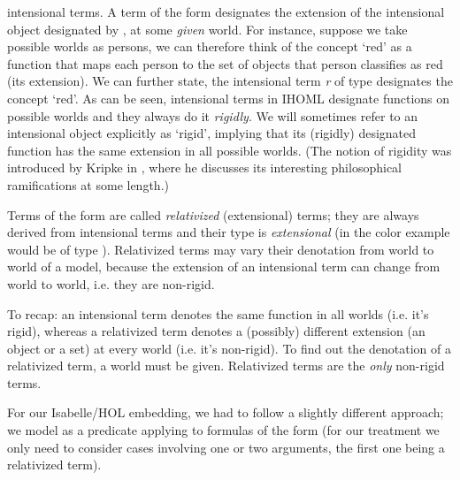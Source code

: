 \begin{isabellebody}
\begin{isamarkuptext}
 intensional terms. A term of the form \isa{{\isasymdown}{\isasymalpha}} designates the extension of the intensional object designated by 
 \isa{{\isasymalpha}}, at some \emph{given} world. For instance, suppose we take possible worlds as persons,
 we can therefore think of the concept `red' as a function that maps each person to the set of objects that person
 classifies as red (its extension). We can further state, the intensional term \emph{r} of type \isa{{\isasymup}{\isasymlangle}{\isasymzero}{\isasymrangle}} designates the concept `red'.
 As can be seen, intensional terms in IHOML designate functions on possible worlds and they always do it \emph{rigidly}. 
 We will sometimes refer to an intensional object explicitly as `rigid', implying that its (rigidly) designated function has
 the same extension in all possible worlds. (The notion of rigidity was introduced by Kripke in \cite{kripke1980},
 where he discusses its interesting philosophical ramifications at some length.)%
\end{isamarkuptext}\isamarkuptrue%
%
\begin{isamarkuptext}%
Terms of the form \isa{{\isasymdown}{\isasymalpha}} are called \emph{relativized} (extensional) terms; they are always derived
from intensional terms and their type is \emph{extensional} (in the color example  would be of type \isa{{\isasymlangle}{\isasymzero}{\isasymrangle}}).
Relativized terms may vary their denotation from world to world of a model, because the extension of an intensional term can change
from world to world, i.e. they are non-rigid.%
\end{isamarkuptext}\isamarkuptrue%
%
\begin{isamarkuptext}%
To recap: an intensional term denotes the same function in all worlds (i.e. it's rigid), whereas a relativized term
denotes a (possibly) different extension (an object or a set) at every world (i.e. it's non-rigid). To find out
the denotation of a relativized term, a world must be given. Relativized terms are the \emph{only} non-rigid terms.%
\end{isamarkuptext}\isamarkuptrue%
%
\begin{isamarkuptext}%
For our Isabelle/HOL embedding, we had to follow a slightly different approach; we model \isa{{\isasymdown}}
as a predicate applying to formulas of the form  (for our treatment
we only need to consider cases involving one or two arguments, the first one being a relativized term).

\end{isamarkuptext}
\end{isabellebody}
